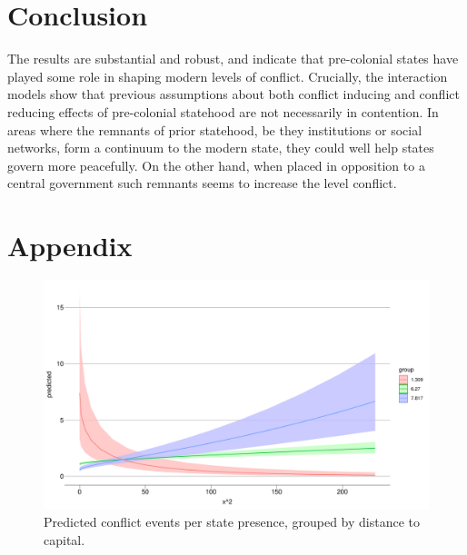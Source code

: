 \documentclass[12pt]{article}
\begin{document}
\section{Conclusion}

The results are substantial  and robust, and indicate that pre-colonial states
have played some role in shaping modern levels of conflict. Crucially, the
interaction models show that previous assumptions about both conflict inducing
and conflict reducing effects of pre-colonial statehood are not necessarily in
contention. In areas where the remnants of prior statehood, be they institutions
or social networks, form a continuum to the modern state, they could well help
states govern more peacefully. On the other hand, when placed in opposition to a
central government such remnants seems to increase the level conflict.


\pagebreak




\pagebreak
\section*{Appendix}






\begin{figure}[htpb]
	\centering
	\includegraphics[width=\linewidth]{"../R/Output/ggStatePlot.pdf"}
	\caption{Predicted conflict events per state presence, grouped by
	distance to capital.}
	\label{state_int}
\end{figure}
\end{document}
